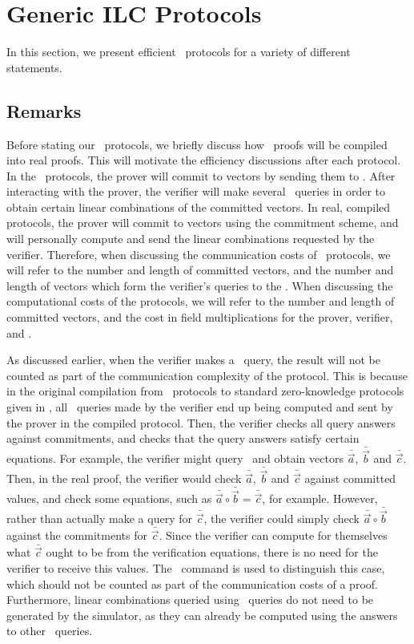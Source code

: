 \chapter{Generic ILC Protocols}
\label{chapterlabel:Generic-Protocol}

In this section, we present efficient \ILC\ protocols for a variety of different statements.

\section{Remarks} Before stating our \ILC \ protocols, we briefly discuss how \ILC\ proofs will be compiled into real proofs. This will motivate the efficiency discussions after each protocol. In the \ILC \ protocols, the prover will commit to vectors by sending them to \ILC. After interacting with the prover, the verifier will make several \ILC\ queries in order to obtain certain linear combinations of the committed vectors. In real, compiled protocols, the prover will commit to vectors using the commitment scheme, and will personally compute and send the linear combinations requested by the verifier. Therefore, when discussing the communication costs of \ILC \ protocols, we will refer to the number and length of committed vectors, and the number and length of vectors which form the verifier's queries to the \ILC. When discussing the computational costs of the protocols, we will refer to the number and length of committed vectors, and the cost in field multiplications for the prover, verifier, and \ILC.

As discussed earlier, when the verifier makes a \ILCcheck\ query, the result will not be counted as part of the communication complexity of the protocol. This is because in the original compilation from \ILC\ protocols to standard zero-knowledge protocols given in \cite{BootleCGGHJ17}, all \ILCopen\ queries made by the verifier end up being computed and sent by the prover in the compiled protocol. Then, the verifier checks all query answers against commitments, and checks that the query answers satisfy certain equations. For example, the verifier might query \ILC\ and obtain vectors $\bar{\vec{a}}$, $\bar{\vec{b}}$ and $\bar{\vec{c}}$. Then, in the real proof, the verifier would check $\bar{\vec{a}}$, $\bar{\vec{b}}$ and $\bar{\vec{c}}$ against committed values, and check some equations, such as $\bar{\vec{a}} \circ \bar{\vec{b}} = \bar{\vec{c}}$, for example. However, rather than actually make a query for $\bar{\vec{c}}$, the verifier could simply check $\bar{\vec{a}} \circ \bar{\vec{b}}$ against the commitments for $\bar{\vec{c}}$. Since the verifier can compute for themselves what $\bar{\vec{c}}$ ought to be from the verification equations, there is no need for the verifier to receive this values. The \ILCcheck\ command is used to distinguish this case, which should not be counted as part of the communication costs of a proof. Furthermore, linear combinations queried using \ILCcheck\ queries do not need to be generated by the simulator, as they can already be computed using the answers to other \ILCopen\ queries.

